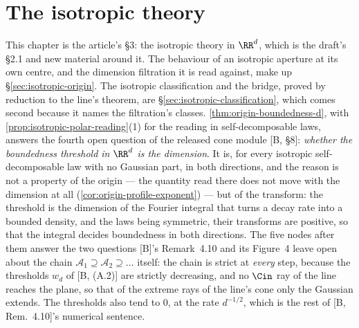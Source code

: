 %
%

\chapter{The isotropic theory}
\label{ch:dimension}

This chapter is the article's \S 3: the isotropic theory in $\RR^d$, which is the draft's \S 2.1 and
new material around it. The behaviour of an isotropic aperture at its own centre, and the dimension
filtration it is read against, make up \S\ref{sec:isotropic-origin}. The isotropic classification and
the bridge, proved by reduction to the line's theorem, are \S\ref{sec:isotropic-classification}, which
comes second because it names the filtration's classes. \ref{thm:origin-boundedness-d}, with
\ref{prop:isotropic-polar-reading}(1) for the reading in self-decomposable laws, answers the
fourth open question of the released cone module [B, \S 8]: \emph{whether the boundedness
threshold in $\RR^d$ is the dimension}. It is, for every isotropic self-decomposable law with no
Gaussian part, in both directions, and the reason is not a property of the origin ---
the quantity read there does not move with the dimension at all
(\ref{cor:origin-profile-exponent}) --- but of the transform: the
threshold is the dimension of the Fourier integral that turns a decay rate into a bounded
density, and the laws being symmetric, their transforms are positive, so that the integral
decides boundedness in both directions. The five nodes after them answer the two questions [B]'s Remark~4.10 and its Figure~4
leave open about the chain $\mathcal{A}_1 \supseteq \mathcal{A}_2 \supseteq \dots$ itself: the
chain is strict at \emph{every} step, because the thresholds $w_d$ of [B, (A.2)] are strictly
decreasing, and no $\Cin$ ray of the line reaches the plane, so that of the extreme rays of the
line's cone only the Gaussian extends. The thresholds also tend to $0$, at the rate $d^{-1/2}$,
which is the rest of [B, Rem.~4.10]'s numerical sentence.


